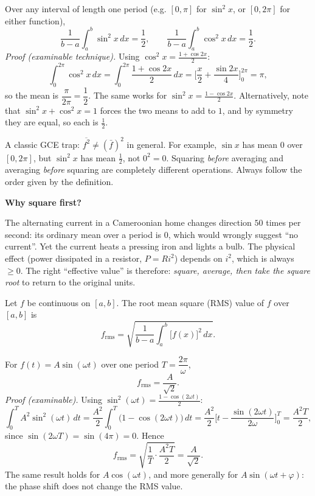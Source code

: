 \documentclass[11pt]{article}
\newcommand{\cle}[1]{{\popxbold\color{popdark}#1}}
\newcounter{popsec}
\newcounter{popsub}
\newcommand{\courssub}[1]{%
  \stepcounter{popsub}%
  \par\vspace{9pt}\noindent{\popxbold\fontsize{11.5}{13}\selectfont\color{popink}{\color{poporange}\thepopsec.\thepopsub}\hspace{6pt}#1}\par\nopagebreak\vspace{4pt}
}
\begin{document}
\begin{propriete}
Over any interval of length one period (e.g. $[0,\pi]$ for $\sin^2 x$, or $[0,2\pi]$ for either function),
\[
\frac{1}{b-a}\int_a^b \sin^2 x\,dx=\frac12,
\qquad
\frac{1}{b-a}\int_a^b \cos^2 x\,dx=\frac12.
\]
\emph{Proof (examinable technique).} Using $\cos^2x=\frac{1+\cos 2x}{2}$:
\[
\int_0^{2\pi}\cos^2x\,dx
=\int_0^{2\pi}\frac{1+\cos 2x}{2}\,dx
=\Big[\frac{x}{2}+\frac{\sin 2x}{4}\Big]_0^{2\pi}
=\pi,
\]
so the mean is $\dfrac{\pi}{2\pi}=\dfrac12$. The same works for $\sin^2x=\frac{1-\cos 2x}{2}$. Alternatively, note that $\sin^2x+\cos^2x=1$ forces the two means to add to $1$, and by symmetry they are equal, so each is $\tfrac12$.
\end{propriete}

\begin{attention}
A classic GCE trap: $\overline{f^2}\neq (\bar f)^2$ in general. For example, $\sin x$ has mean $0$ over $[0,2\pi]$, but $\sin^2 x$ has mean $\tfrac12$, not $0^2=0$. Squaring \emph{before} averaging and averaging \emph{before} squaring are completely different operations. Always follow the order given by the definition.
\end{attention}

\courssub{The Root Mean Square (RMS) Value}

\textbf{Why square first?}\par
The alternating current in a Cameroonian home changes direction $50$ times per second: its ordinary mean over a period is $0$, which would wrongly suggest ``no current''. Yet the current heats a pressing iron and lights a bulb. The physical effect (power dissipated in a resistor, $P=Ri^2$) depends on $i^2$, which is always $\ge 0$. The right ``effective value'' is therefore: \emph{square, average, then take the square root} to return to the original units.

\begin{definition}
Let $f$ be continuous on $[a,b]$. The \cle{root mean square} (RMS) value of $f$ over $[a,b]$ is
\[
f_{\mathrm{rms}}=\sqrt{\frac{1}{b-a}\int_a^b \big[f(x)\big]^2\,dx}.
\]
\end{definition}

\begin{propriete}
For $f(t)=A\sin(\omega t)$ over one period $T=\dfrac{2\pi}{\omega}$,
\[
f_{\mathrm{rms}}=\frac{A}{\sqrt{2}}.
\]
\emph{Proof (examinable).} Using $\sin^2(\omega t)=\frac{1-\cos(2\omega t)}{2}$:
\[
\int_0^{T} A^2\sin^2(\omega t)\,dt
=\frac{A^2}{2}\int_0^{T}\big(1-\cos(2\omega t)\big)\,dt
=\frac{A^2}{2}\Big[t-\frac{\sin(2\omega t)}{2\omega}\Big]_0^{T}
=\frac{A^2 T}{2},
\]
since $\sin(2\omega T)=\sin(4\pi)=0$. Hence
\[
f_{\mathrm{rms}}=\sqrt{\frac{1}{T}\cdot\frac{A^2T}{2}}=\frac{A}{\sqrt{2}}.
\]
The same result holds for $A\cos(\omega t)$, and more generally for $A\sin(\omega t+\varphi)$: the phase shift does not change the RMS value.
\end{propriete}
\end{document}
